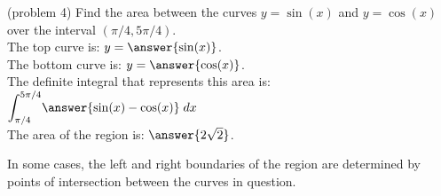\documentclass{ximera}
\begin{document}
                    
                    
                                         
\begin{problem}(problem 4)
Find the area between the curves $y = \sin(x)$ and $y = \cos(x)$ over the interval $(\pi/4, 5\pi/4)$.\\


The top curve is: $y = \answer{\sin(x)}$.\\
The bottom curve is: $y = \answer{\cos(x)}$.\\
The definite integral that represents this area is: $\displaystyle{\int_{\pi/4}^{5\pi/4}} \answer{\sin(x) - \cos(x)} \; dx$\\
The area of the region is: $\answer{2\sqrt 2}$.


\end{problem}

In some cases, the left and right boundaries of the region are determined by points of intersection between the curves in question.
\end{document}
